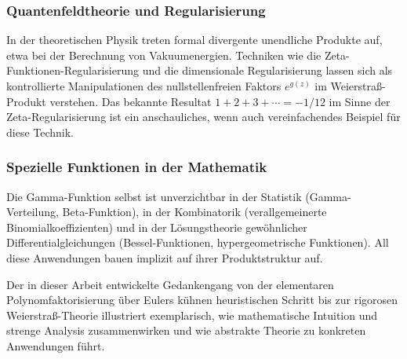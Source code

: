\subsubsection{Quantenfeldtheorie und Regularisierung}
In der theoretischen Physik treten formal divergente unendliche Produkte auf,
etwa bei der Berechnung von Vakuumenergien.
%
Techniken wie die Zeta-Funktionen-Regularisierung und die dimensionale Regularisierung
%
%
lassen sich als kontrollierte Manipulationen des nullstellenfreien Faktors $e^{g(z)}$
im Weierstraß-Produkt verstehen.
Das bekannte Resultat $1 + 2 + 3 + \cdots = -1/12$ im Sinne der
Zeta-Regularisierung ist ein anschauliches, wenn auch vereinfachendes Beispiel
für diese Technik.

\subsubsection{Spezielle Funktionen in der Mathematik}
Die Gamma-Funktion selbst ist unverzichtbar in der Statistik
(Gamma-Verteilung, Beta-Funktion), in der Kombinatorik
(verallgemeinerte Binomialkoeffizienten) und in der Lösungstheorie
gewöhnlicher Differentialgleichungen (Bessel-Funktionen,
hypergeometrische Funktionen).
All diese Anwendungen bauen implizit auf ihrer Produktstruktur auf.

Der in dieser Arbeit entwickelte Gedankengang
von der elementaren Polynomfaktorisierung über Eulers kühnen heuristischen Schritt
bis zur rigorosen Weierstraß-Theorie 
illustriert exemplarisch, wie mathematische Intuition und strenge Analysis
zusammenwirken und wie abstrakte Theorie zu konkreten Anwendungen führt.
